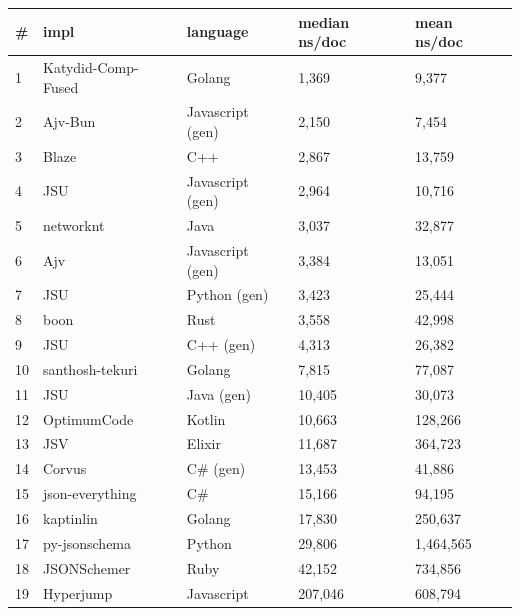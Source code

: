 \begin{tabular}{ll|l|ll}
\# & impl & language & median ns/doc & mean ns/doc \\
\hline
1 & Katydid-Comp-Fused & Golang & 1,369 & 9,377 \\
2 & Ajv-Bun & Javascript (gen) & 2,150 & 7,454 \\
3 & Blaze & C++ & 2,867 & 13,759 \\
4 & JSU & Javascript (gen) & 2,964 & 10,716 \\
5 & networknt & Java & 3,037 & 32,877 \\
6 & Ajv & Javascript (gen) & 3,384 & 13,051 \\
7 & JSU & Python (gen) & 3,423 & 25,444 \\
8 & boon & Rust & 3,558 & 42,998 \\
9 & JSU & C++ (gen) & 4,313 & 26,382 \\
10 & santhosh-tekuri & Golang & 7,815 & 77,087 \\
11 & JSU & Java (gen) & 10,405 & 30,073 \\
12 & OptimumCode & Kotlin & 10,663 & 128,266 \\
13 & JSV & Elixir & 11,687 & 364,723 \\
14 & Corvus & C\# (gen) & 13,453 & 41,886 \\
15 & json-everything & C\# & 15,166 & 94,195 \\
16 & kaptinlin & Golang & 17,830 & 250,637 \\
17 & py-jsonschema & Python & 29,806 & 1,464,565 \\
18 & JSONSchemer & Ruby & 42,152 & 734,856 \\
19 & Hyperjump & Javascript & 207,046 & 608,794 \\
\end{tabular}
